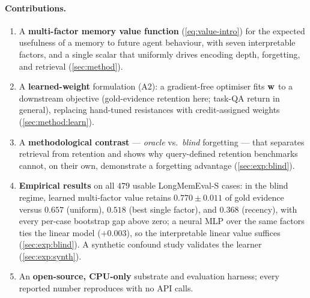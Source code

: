 \paragraph{Contributions.}
\begin{enumerate}[leftmargin=1.4em,itemsep=2pt,topsep=2pt]
\item A \textbf{multi-factor memory value function}
(\cref{eq:value-intro}) for the expected usefulness of a memory to
future agent behaviour, with seven interpretable factors, and a single
scalar that uniformly drives encoding depth, forgetting, and retrieval
(\cref{sec:method}).
\item A \textbf{learned-weight} formulation (A2): a gradient-free
optimiser fits $\mathbf{w}$ to a downstream objective (gold-evidence retention
here; task-QA return in general), replacing hand-tuned resistances with
credit-assigned weights (\cref{sec:method:learn}).
\item A \textbf{methodological contrast} --- \emph{oracle} vs.\
\emph{blind} forgetting --- that separates retrieval from retention and
shows why query-defined retention benchmarks cannot, on their own,
demonstrate a forgetting advantage (\cref{sec:exp:blind}).
\item \textbf{Empirical results} on all $479$ usable LongMemEval-S cases:
in the blind regime, learned multi-factor value retains $0.770\pm0.011$ of
gold evidence versus $0.657$ (uniform), $0.518$ (best single factor), and
$0.368$ (recency), with every per-case bootstrap gap above zero; a neural
MLP over the same factors ties the linear model ($+0.003$), so the
interpretable linear value suffices (\cref{sec:exp:blind}). A synthetic
confound study validates the learner (\cref{sec:exp:synth}).
\item An \textbf{open-source, CPU-only} substrate and evaluation harness;
every reported number reproduces with no API calls.
\end{enumerate}
